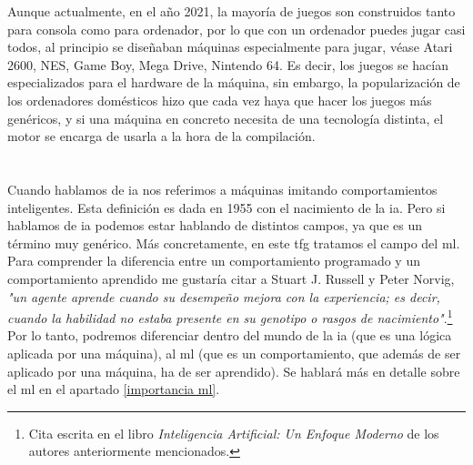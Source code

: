 Aunque actualmente, en el año 2021, la mayoría de juegos son construidos tanto para consola como para ordenador, por lo que con un ordenador puedes jugar casi todos, al principio se diseñaban máquinas especialmente para jugar, véase Atari 2600, NES, Game Boy, Mega Drive, Nintendo 64. Es decir, los juegos se hacían especializados para el hardware de la máquina, sin embargo, la popularización de los ordenadores domésticos hizo que cada vez haya que hacer los juegos más genéricos, y si una máquina en concreto necesita de una tecnología distinta, el motor se encarga de usarla a la hora de la compilación.

\section{}
Cuando hablamos de \gls{ia} nos referimos a máquinas imitando comportamientos inteligentes. Esta definición es dada en 1955 con el nacimiento de la \gls{ia}. Pero si hablamos de \gls{ia} podemos estar hablando de distintos campos, ya que es un término muy genérico. Más concretamente, en este \gls{tfg} tratamos el campo del \gls{ml}.
\\
Para comprender la diferencia entre un comportamiento programado y un comportamiento aprendido me gustaría citar a Stuart J. Russell y Peter Norvig, \textit{"un agente aprende cuando su desempeño mejora con la experiencia; es decir, cuando la habilidad no estaba presente en su genotipo o rasgos de nacimiento"}.\footnote{Cita escrita en el libro \textit{Inteligencia Artificial: Un Enfoque Moderno} de los autores anteriormente mencionados.} Por lo tanto, podremos diferenciar dentro del mundo de la \gls{ia} (que es una lógica aplicada por una máquina), al \gls{ml} (que es un comportamiento, que además de ser aplicado por una máquina, ha de ser aprendido). Se hablará más en detalle sobre el \gls{ml} en el apartado \ref{importancia ml}.

